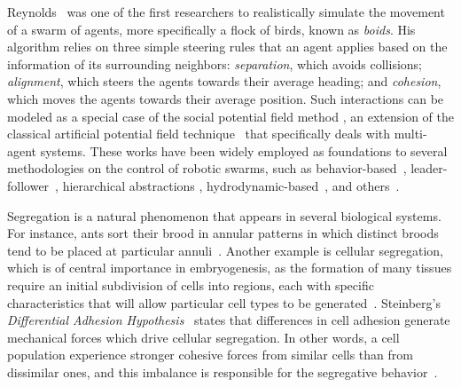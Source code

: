 \documentclass[letterpaper, 10 pt, conference]{ieeeconf}  %
\begin{document}
Reynolds~\cite{Reynolds:87} was one of the first researchers to
realistically simulate the movement of a swarm of agents, more
specifically a flock of birds, known as \textit{boids}. His algorithm
relies on three simple steering rules that an agent applies based on
the information of its surrounding neighbors: \textit{separation},
which avoids collisions; \textit{alignment}, which steers the agents
towards their average heading; and \textit{cohesion}, which moves the
agents towards their average position. Such interactions can be
modeled as a special case of the social potential field method
\cite{Reif:99}, an extension of the classical artificial potential
field technique~\cite{Khatib:85} that specifically deals with
multi-agent systems. These works have been widely employed as
foundations to several methodologies on the control of robotic swarms,
such as behavior-based~\cite{Balch:98},
leader-follower~\cite{Leonard:01,Tanner:04}, hierarchical abstractions
\cite{Belta:04,Santos:11a}, hydrodynamic-based~\cite{Pimenta:13}, and
others~\cite{Olfati-Saber:06,Tanner:07}.

Segregation is a natural phenomenon that appears in several
biological systems. For instance, ants sort their brood in annular
patterns in which distinct broods tend to be placed at particular
annuli~\cite{Franks:92}. Another example is cellular segregation,
which is of central importance in embryogenesis, as the formation of
many tissues require an initial subdivision of cells into regions,
each with specific characteristics that will allow particular cell
types to be generated~\cite{Eduard:12}. Steinberg's
\textit{Differential Adhesion Hypothesis}~\cite{Steinberg:63} states
that differences in cell adhesion generate mechanical forces which
drive cellular segregation. In other words, a cell population
experience stronger cohesive forces from similar cells than from
dissimilar ones, and this imbalance is responsible for the segregative
behavior~\cite{Eduard:12}.
\end{document}
